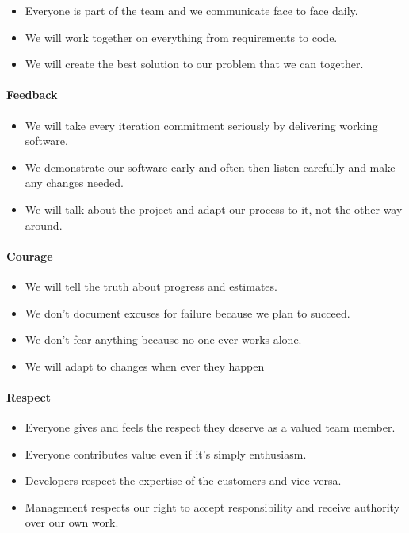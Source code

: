 \begin{itemize}
\tightlist
\item
  Everyone is part of the team and we communicate face to face daily.
\item
  We will work together on everything from requirements to code.
\item
  We will create the best solution to our problem that we can together.
\end{itemize}

\hypertarget{feedback}{%
\paragraph{Feedback}\label{feedback}}

\begin{itemize}
\tightlist
\item
  We will take every iteration commitment seriously by delivering
  working software.
\item
  We demonstrate our software early and often then listen carefully and
  make any changes needed.
\item
  We will talk about the project and adapt our process to it, not the
  other way around.
\end{itemize}

\hypertarget{courage}{%
\paragraph{Courage}\label{courage}}

\begin{itemize}
\tightlist
\item
  We will tell the truth about progress and estimates.
\item
  We don't document excuses for failure because we plan to succeed.
\item
  We don't fear anything because no one ever works alone.
\item
  We will adapt to changes when ever they happen
\end{itemize}

\hypertarget{respect}{%
\paragraph{Respect}\label{respect}}

\begin{itemize}
\tightlist
\item
  Everyone gives and feels the respect they deserve as a valued team
  member.
\item
  Everyone contributes value even if it's simply enthusiasm.
\item
  Developers respect the expertise of the customers and vice versa.
\item
  Management respects our right to accept responsibility and receive
  authority over our own work.
\end{itemize}

